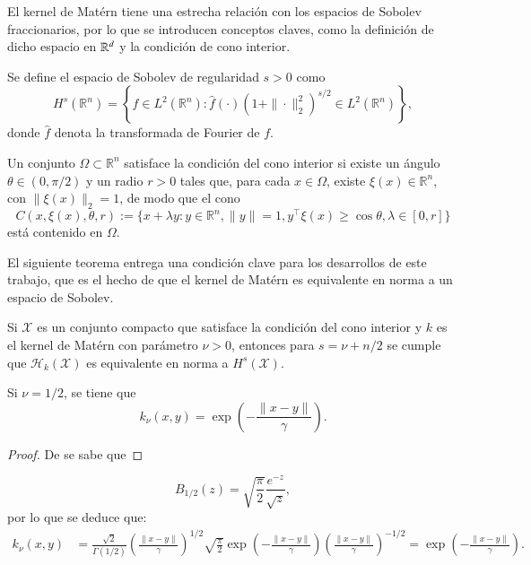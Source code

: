 El kernel de Matérn tiene una estrecha relación con los espacios de Sobolev fraccionarios, por lo que se introducen conceptos claves, como la definición de dicho espacio en $\mathbb{R}^d$ y la condición de cono interior.

\begin{defn} Se define el espacio de Sobolev de regularidad $s > 0$ como
\[
H^s(\mathbb{R}^n) = \left\{ f \in L^2(\mathbb{R}^n) : \widehat{f}(\cdot)(1 + \|\cdot\|_2^2)^{s/2} \in L^2(\mathbb{R}^n) \right\},
\]
donde \( \widehat{f} \) denota la transformada de Fourier de \( f \).
\label{def:frac_sob}
\end{defn}

\begin{defn}
Un conjunto \( \Omega \subset \mathbb{R}^n \) satisface la condición del cono interior si existe un ángulo \( \theta \in (0, \pi/2) \) y un radio \( r > 0 \) tales que, para cada \( x \in \Omega \), existe \( \xi(x) \in \mathbb{R}^n \), con \( \|\xi(x)\|_2 = 1 \), de modo que el cono
\[
C(x, \xi(x), \theta, r) := \{x + \lambda y : y \in \mathbb{R}^n, \|y\| = 1, y^\top \xi(x) \geq \cos \theta, \lambda \in [0, r]\}
\]
está contenido en \( \Omega \).
\end{defn}
El siguiente teorema entrega una condición clave para los desarrollos de este trabajo, que es el hecho de que el kernel de Matérn es equivalente en norma a un espacio de Sobolev.
\begin{teo}
Si \( \mathcal{X} \) es un conjunto compacto que satisface la condición del cono interior y \( k \) es el kernel de Matérn con parámetro \( \nu > 0 \), entonces para \( s = \nu + n/2 \) se cumple que \( \mathcal{H}_k (\mathcal{X}) \) es equivalente en norma a \( H^s (\mathcal{X}) \).
\end{teo}

\begin{prop}
    Si $\nu = 1/2$, se tiene que
    \[
    k_\nu (x, y) = \exp \left( -\frac{\|x-y\|}{\gamma} \right).
    \]
\end{prop}

\begin{proof}
    De \cite{Barton1965HandbookTables., Davis1944AFunctions} se sabe que
\end{proof}
    \[
B_{1/2} (z) = \sqrt{ \frac{\pi}{2} } \frac{e^{-z}}{\sqrt{z}},
\]
por lo que se deduce que:
\[
\begin{aligned}
k_\nu (x,y) &= \frac{\sqrt{2}}{\Gamma(1/2)} \left(  \frac{\|x-y\|}{\gamma} \right)^{1/2} \sqrt{ \frac{\pi}{2} } \exp \left( -\frac{\|x-y\|}{\gamma} \right) \left(  \frac{\|x-y\|}{\gamma} \right)^{-1/2} = \exp \left( -\frac{\|x-y\|}{\gamma} \right).
\end{aligned}
\]

